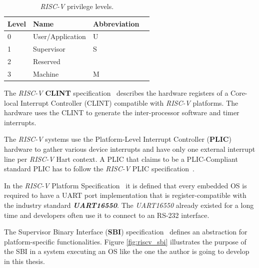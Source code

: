 \begin{table}[!ht]
  \centering
  \begin{tabular}{|l|l|l|l|}
  \hline
  \textbf{Level} & \textbf{Name}    & \textbf{Abbreviation} \\ \hline
  0              & User/Application & U                     \\ \hline
  1              & Supervisor       & S                     \\ \hline
  2              & Reserved         &                       \\ \hline
  3              & Machine          & M                     \\ \hline
  \end{tabular}
  \caption{\textit{RISC-V} privilege levels.}
  \label{tab:riscv_privilege_levels}
\end{table}

The \textit{RISC-V} \textbf{CLINT} specification~\cite{clint_riscv_spec} describes the hardware registers of a Core-local Interrupt Controller (CLINT) compatible with \textit{RISC-V} platforms. The hardware uses the CLINT to generate the inter-processor software and timer interrupts.

The \textit{RISC-V} systems use the Platform-Level Interrupt Controller (\textbf{PLIC}) hardware to gather various device interrupts and have only one external interrupt line per \textit{RISC-V} Hart context. A PLIC that claims to be a PLIC-Compliant standard PLIC has to follow the \textit{RISC-V} PLIC specification~\cite{plic_riscv_spec}.

In the \textit{RISC-V} Platform Specification~\cite{riscv_platform_specification} it is defined that every embedded OS is required to have a UART port implementation that is register-compatible with the industry standard \textbf{\textit{UART16550}}. The \textit{UART16550} already existed for a long time and developers often use it to connect to an RS-232 interface.

The Supervisor Binary Interface (\textbf{SBI}) specification~\cite{sbi_riscv_spec} defines an abstraction for platform-specific functionalities. Figure \ref{fig:riscv_sbi} illustrates the purpose of the SBI in a system executing an OS like the one the author is going to develop in this thesis.

